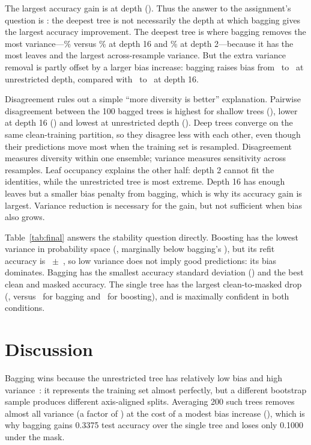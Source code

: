 \documentclass[10pt,twocolumn,letterpaper]{article}
\begin{document}
The largest accuracy gain is at depth \LargestImprovementDepth
(\LargestImprovementGain).  Thus the answer to the assignment's question is
\textbf{\DeepestLargest}: the deepest tree is not necessarily the depth at which
bagging gives the largest accuracy improvement.  The deepest tree is where
bagging removes the most variance---\DepthDeepVarRed\% versus \DepthMidVarRed\%
at depth 16 and \DepthShallowVarRed\% at depth 2---because it has the most leaves
and the largest across-resample variance.  But the extra variance removal is
partly offset by a larger bias increase: bagging raises bias from
\DepthDeepSingleBias~to \DepthDeepBagBias~at unrestricted depth, compared with
\DepthMidSingleBias~to \DepthMidBagBias~at depth 16.

Disagreement rules out a simple ``more diversity is better'' explanation.
Pairwise disagreement between the 100 bagged trees is highest for shallow trees
(\DepthShallowDis), lower at depth 16 (\DepthMidDis) and lowest at unrestricted
depth (\DepthDeepDis).  Deep trees converge on the same clean-training
partition, so they disagree less with each other, even though their predictions
move most when the training set is resampled.  Disagreement measures diversity
within one ensemble; variance measures sensitivity across resamples.  Leaf
occupancy explains the other half: depth 2 cannot fit the identities, while the
unrestricted tree is most extreme.  Depth 16 has enough leaves but a smaller
bias penalty from bagging, which is why its accuracy gain is largest.  Variance
reduction is necessary for the gain, but not sufficient when bias also grows.

Table~\ref{tab:final} answers the stability question directly.  Boosting has
the lowest variance in probability space (\BoostVar, marginally below bagging's
\BagVar), but its refit accuracy is \BoostRefitAcc~$\pm$~\BoostRefitStd, so low
variance does not imply good predictions: its bias dominates.  Bagging has the
smallest accuracy standard deviation (\BagRefitStd) and the best clean and
masked accuracy.  The single tree has the largest clean-to-masked drop
(\TreeCleanDrop, versus \BagCleanDrop~for bagging and \BoostCleanDrop~for
boosting), and is maximally confident in both conditions.

\section{Discussion}

Bagging wins because the unrestricted tree has relatively low bias and high
variance~\cite{dietterich2000}: it represents the training set almost perfectly,
but a different bootstrap sample produces different axis-aligned splits.
Averaging 200 such trees removes almost all variance (a factor of \BagVarRatio)
at the cost of a modest bias increase (\BagBiasDelta), which is why bagging gains
0.3375 test accuracy over the single tree and loses only 0.1000 under the mask.
\end{document}
